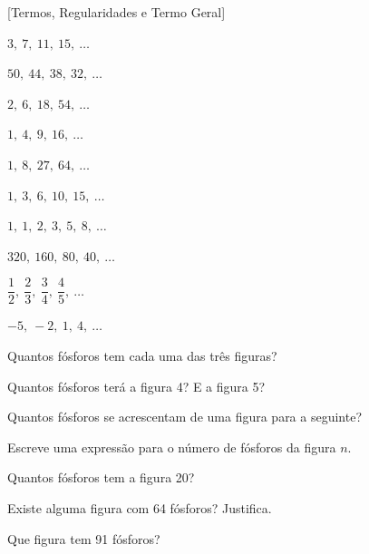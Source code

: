 \documentclass[12pt]{article}
\begin{document}
[Termos, Regularidades e Termo Geral]


\begin{exercicios}
  \item $3,\ 7,\ 11,\ 15,\ \ldots$
  \item $50,\ 44,\ 38,\ 32,\ \ldots$
  \item $2,\ 6,\ 18,\ 54,\ \ldots$
  \item $1,\ 4,\ 9,\ 16,\ \ldots$
  \item $1,\ 8,\ 27,\ 64,\ \ldots$
  \item $1,\ 3,\ 6,\ 10,\ 15,\ \ldots$
  \item $1,\ 1,\ 2,\ 3,\ 5,\ 8,\ \ldots$
  \item $320,\ 160,\ 80,\ 40,\ \ldots$
  \item $\dfrac{1}{2},\ \dfrac{2}{3},\ \dfrac{3}{4},\ \dfrac{4}{5},\ \ldots$
  \item $-5,\ -2,\ 1,\ 4,\ \ldots$
\end{exercicios}


\begin{center}
\end{center}

\begin{exercicios}
  \item Quantos fósforos tem cada uma das três figuras?
  \item Quantos fósforos terá a figura 4? E a figura 5?
  \item Quantos fósforos se acrescentam de uma figura para a seguinte?
  \item Escreve uma expressão para o número de fósforos da figura $n$.
  \item Quantos fósforos tem a figura 20?
  \item Existe alguma figura com 64 fósforos? Justifica.
  \item Que figura tem 91 fósforos?
\end{exercicios}
\end{document}
